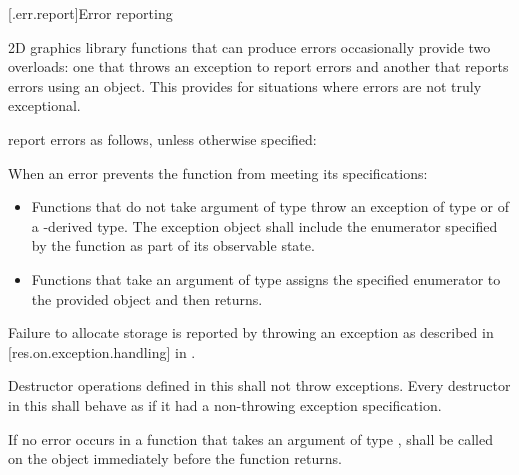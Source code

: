 [\iotwod.err.report]{Error reporting}

\pnum
2D graphics library functions that can produce errors occasionally provide two overloads: one that throws an exception to report errors and another that reports errors using an  object. This provides for situations where errors are not truly exceptional.

\pnum
report errors as follows, unless otherwise specified:

\pnum
When an error prevents the function from meeting its specifications:

\begin{itemize}
\item Functions that do not take argument of type  throw an exception of type  or of a -derived type. The exception object shall include the enumerator specified by the function as part of its observable state.

\item Functions that take an argument of type  assigns the specified enumerator to the provided  object and then returns.
\end{itemize}

\pnum
Failure to allocate storage is reported by throwing an exception as described in [res.on.exception.handling] in \cppseventeen.

\pnum
Destructor operations defined in this \documenttypename{} shall not throw exceptions. Every destructor in this \documenttypename{} shall behave as if it had a non-throwing exception specification.

\pnum
If no error occurs in a function that takes an argument of type ,  shall be called on the  object immediately before the function returns.
